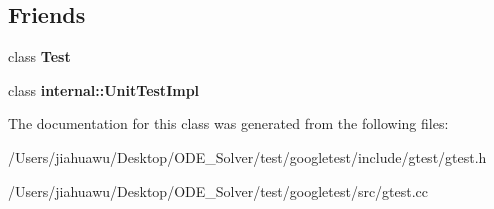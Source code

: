 \subsection*{Friends}
\begin{DoxyCompactItemize}
\item 
\mbox{\label{classtesting_1_1_test_case_a5b78b1c2e1fa07ffed92da365593eaa4}} 
class {\bfseries Test}
\item 
\mbox{\label{classtesting_1_1_test_case_acc0a5e7573fd6ae7ad1878613bb86853}} 
class {\bfseries internal\+::\+Unit\+Test\+Impl}
\end{DoxyCompactItemize}


The documentation for this class was generated from the following files\+:\begin{DoxyCompactItemize}
\item 
/\+Users/jiahuawu/\+Desktop/\+O\+D\+E\+\_\+\+Solver/test/googletest/include/gtest/gtest.\+h\item 
/\+Users/jiahuawu/\+Desktop/\+O\+D\+E\+\_\+\+Solver/test/googletest/src/gtest.\+cc\end{DoxyCompactItemize}
